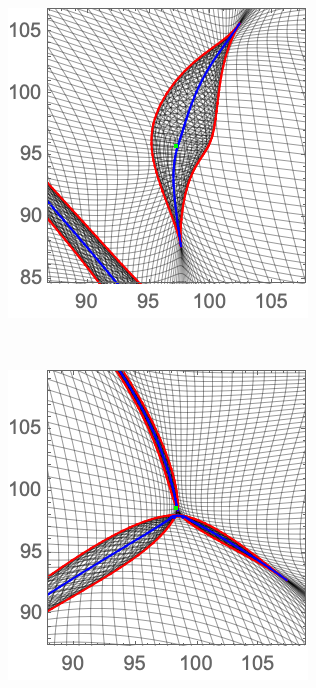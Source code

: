\documentclass[a4paper, 11pt]{article}
\begin{document}
\begin{figure}
\centering
\begin{subfigure}[b]{0.24\textwidth}
\includegraphics[width=\textwidth]{Cusp_Z_Zoom}
\end{subfigure}~
\begin{subfigure}[b]{0.24\textwidth}
\includegraphics[width=\textwidth]{Swallowtail_Z_Zoom}

\end{subfigure}
\end{figure}
\end{document}
